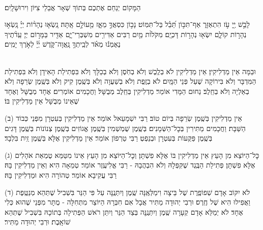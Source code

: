 \documentclass[twoside, openany, parskip=half, 11pt]{book}
\begin{document}
\begin{sometimes}

\\
הַמָּקוֹם יְנַחֵם אֶתְכֶם בְּתוֹךְ שְׁאָר אֲבֵלֵי צִיּוֹן וִירוּשָׁלָֽיִם׃

\end{sometimes}


\mizmorshabbat

לָבֵ֣שׁ יְ֖יָ עֹ֣ז הִתְאַזָּר֑ אַף־תִּכּ֣וֹן תֵּ֝בֵ֗ל בַּל־תִּמּֽוֹט׃
נָכ֣וֹן כִּסְאֲךָ֣ מֵאָ֑ז מֵ֖עוֹלָ֣ם אָֽתָּה׃
נָֽשְׂא֤וּ נְהָר֨וֹת יְיָ֗ נָֽשְׂא֣וּ נְהָר֣וֹת קוֹלָ֑ם יִשְׂא֖וּ נְהָר֣וֹת דָּכְיָֽם׃
מִקֹּלוֹ֨ת מַ֤יִם רַבִּים אַדִּירִ֥ים מִשְׁבְּרֵי־יָ֑ם אַדִּ֖יר בַּמָּר֣וֹם יְיָ׃
עֵֽדֹ֨תֶיךָ נֶאֶמְנ֬וּ מְאֹ֗ד לְבֵֽיתְךָ֥ נָֽאֲוָה־קֹּ֑דֶשׁ יְ֜יָ֗ לְאֹ֣רֶךְ יָמִֽים׃

\mournerskaddish


\\
וּבַמָּה אֵין מַדְלִיקִין׃ אֵין מַדְלִיקִין לֹא בְלֶֽכֶשׁ וְלֹא בְחֹֽסֶן וְלֹא בְכַלָּךְ וְלֹא בִּפְתִילַת הָאִידָן וְלֹא בִּפְתִילַת הַמִּדְבָּר וְלֹא בִּירוֹקָה שֶׁעַל פְּנֵי הַמָּֽיִם׃ לֹא בְזֶֽפֶת וְלֹא בְשַׁעֲוָה וְלֹא בְּשֶֽׁמֶן קִיק וְלֹא בְּשֶֽׁמֶן שְׂרֵפָה וְלֹא בְאַלְיָה וְלֹא בְחֵֽלֶב׃ נַחוּם הַמָּדִי אוֹמֵר׃ מַדְלִיקִין בְּחֵֽלֶב מְבֻשָּׁל׃ וַחֲכָמִים אוֹמְרִים׃ אֶחָד מְבֻשָּׁל וְאֶחָד שֶׁאֵינוֹ מְבֻשָּׁל אֵין מַדְלִיקִין בּוֹ׃

(ב) אֵין מַדְלִיקִין בְּשֶֽׁמֶן שְׂרֵפָה בְּיוֹם טוֹב׃ רַבִּי יִשְׁמָעֵאל אוֹמֵר׃ אֵין מַדְלִיקִין בְּעִטְרָן מִפְּנֵי כְּבוֹד הַשַּׁבָּת׃ וַחֲכָמִים מַתִּירִין בְּכׇל־הַשְּׁמָנִים׃ בְּשֶֽׁמֶן שֻׁמְשְׁמִין בְּשֶֽׁמֶן אֱגוֹזִים בְּשֶֽׁמֶן צְנוֹנוֹת בְּשֶֽׁמֶן דָּגִים בְּשֶֽׁמֶן פַּקֻּעוֹת בְּעִטְרָן וּבְנֵפְטְ׃ רַבִּי טַרְפוֹן אוֹמֵר׃ אֵין מַדְלִיקִין אֶלָּא בְּשֶֽׁמֶן זַֽיִת בִּלְבָד׃

(ג) כׇּל־הַיּוֹצֵא מִן הָעֵץ אֵין מַדְלִיקִין בּוֹ אֶלָּא פִשְׁתָּן׃ וְכׇל־הַיּוֹצֵא מִן הָעֵץ אֵינוֹ מִטַּמֵּא טֻמְאַת אֹהָלִים אֶלָּא פִשְׁתָּן׃ פְּתִילַת הַבֶּֽגֶד שֶׁקִּפְּלָהּ וְלֹא הִבְהֲבָהּ - רַבִּי אֱלִיעֶֽזֶר אוֹמֵר׃ טְמֵאָה הִיא וְאֵין מַדְלִיקִין בָּהּ׃ רַבִּי עֲקִיבָא אוֹמֵר׃ טְהוֹרָה הִיא וּמַדְלִיקִין בָּהּ׃

(ד) לֹא יִקּוֹב אָדָם שְׁפוֹפֶֽרֶת שֶׁל בֵּיצָה וִימַלְּאֶֽנָּה שֶֽׁמֶן וְיִתְּנֶֽנָּה עַל פִּי הַנֵּר בִּשְׁבִיל שֶׁתְּהֵא מְנַטֶּֽפֶת וַאֲפִילוּ הִיא שֶׁל חֶֽרֶס׃ וּרְבִי יְהוּדָה מַתִּיר אֲבָל אִם חִבְּרָהּ הַיּוֹצֵר מִתְּחִלָּה - מֻתָּר מִפְּנֵי שֶׁהוּא כְּלִי אֶחָד׃ לֹא יְמַלֵּא אָדָם קְעָרָה שֶֽׁמֶן וְיִתְּנֶֽנָּה בְּצַד הַנֵּר וְיִתֵּן רֹאשׁ הַפְּתִילָה בְּתוֹכָהּ בִּשְׁבִיל שֶׁתְּהֵא שׁוֹאָֽבֶת׃ וּרְבִי יְהוּדָה מַתִּיר׃
\end{document}
